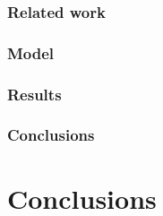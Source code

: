 \documentclass[a4paper]{article}
\begin{document}
\subsubsection{Related work}
\subsubsection{Model}
\subsubsection{Results}
\subsubsection{Conclusions}


\section{Conclusions}
\end{document}
